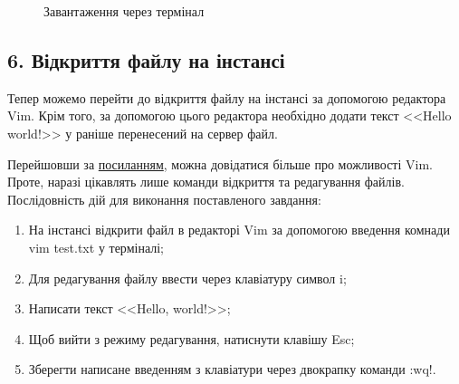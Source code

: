 \documentclass[a4paper,14pt]{extarticle}
\begin{document}
\begin{figure}[H]
    \begin{minipage}[H]{1\linewidth}
    \end{minipage}
    \vfill
    \begin{minipage}[H]{1\linewidth}
        \caption{Завантаження через термінал}
        \label{fig:move by terminal}
    \end{minipage}
\end{figure}

\subsection*{6. Відкриття файлу на інстансі}

Тепер можемо перейти до відкриття файлу на інстансі за допомогою 
редактора Vim. Крім того, за допомогою цього редактора необхідно 
додати текст <<Hello world!>> у раніше перенесений на сервер файл. 

Перейшовши за 
\href{https://www.geeksforgeeks.org/getting-started-with-vim-editor-in-linux/}{посиланням}, 
можна довідатися більше про можливості Vim. Проте, наразі цікавлять
лише команди відкриття та редагування файлів. Послідовність дій 
для виконання поставленого завдання:

\begin{enumerate}
    \item На інстансі відкрити файл в редакторі Vim за допомогою введення 
    комнади {\ttfamily vim test.txt} у терміналі;
    \item Для редагування файлу ввести через клавіатуру символ {\ttfamily i};
    \item Написати текст {\ttfamily <<Hello, world!>>};
    \item Щоб вийти з режиму редагування, натиснути клавішу Esc;
    \item Зберегти написане введенням з клавіатури через двокрапку команди {\ttfamily :wq!}.
\end{enumerate}
\end{document}
